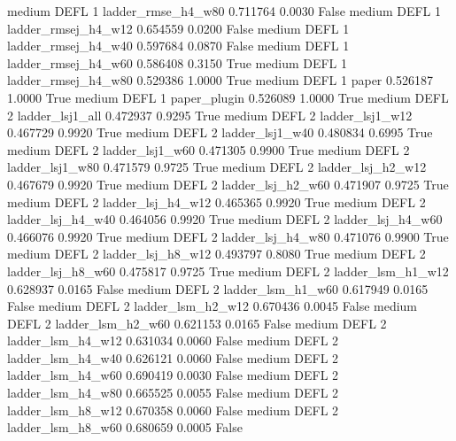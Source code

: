     medium     DEFL                 1  ladder_rmse_h4_w80   0.711764      0.0030   False
    medium     DEFL                 1 ladder_rmsej_h4_w12   0.654559      0.0200   False
    medium     DEFL                 1 ladder_rmsej_h4_w40   0.597684      0.0870   False
    medium     DEFL                 1 ladder_rmsej_h4_w60   0.586408      0.3150    True
    medium     DEFL                 1 ladder_rmsej_h4_w80   0.529386      1.0000    True
    medium     DEFL                 1               paper   0.526187      1.0000    True
    medium     DEFL                 1        paper_plugin   0.526089      1.0000    True
    medium     DEFL                 2     ladder_lsj1_all   0.472937      0.9295    True
    medium     DEFL                 2     ladder_lsj1_w12   0.467729      0.9920    True
    medium     DEFL                 2     ladder_lsj1_w40   0.480834      0.6995    True
    medium     DEFL                 2     ladder_lsj1_w60   0.471305      0.9900    True
    medium     DEFL                 2     ladder_lsj1_w80   0.471579      0.9725    True
    medium     DEFL                 2   ladder_lsj_h2_w12   0.467679      0.9920    True
    medium     DEFL                 2   ladder_lsj_h2_w60   0.471907      0.9725    True
    medium     DEFL                 2   ladder_lsj_h4_w12   0.465365      0.9920    True
    medium     DEFL                 2   ladder_lsj_h4_w40   0.464056      0.9920    True
    medium     DEFL                 2   ladder_lsj_h4_w60   0.466076      0.9920    True
    medium     DEFL                 2   ladder_lsj_h4_w80   0.471076      0.9900    True
    medium     DEFL                 2   ladder_lsj_h8_w12   0.493797      0.8080    True
    medium     DEFL                 2   ladder_lsj_h8_w60   0.475817      0.9725    True
    medium     DEFL                 2   ladder_lsm_h1_w12   0.628937      0.0165   False
    medium     DEFL                 2   ladder_lsm_h1_w60   0.617949      0.0165   False
    medium     DEFL                 2   ladder_lsm_h2_w12   0.670436      0.0045   False
    medium     DEFL                 2   ladder_lsm_h2_w60   0.621153      0.0165   False
    medium     DEFL                 2   ladder_lsm_h4_w12   0.631034      0.0060   False
    medium     DEFL                 2   ladder_lsm_h4_w40   0.626121      0.0060   False
    medium     DEFL                 2   ladder_lsm_h4_w60   0.690419      0.0030   False
    medium     DEFL                 2   ladder_lsm_h4_w80   0.665525      0.0055   False
    medium     DEFL                 2   ladder_lsm_h8_w12   0.670358      0.0060   False
    medium     DEFL                 2   ladder_lsm_h8_w60   0.680659      0.0005   False
